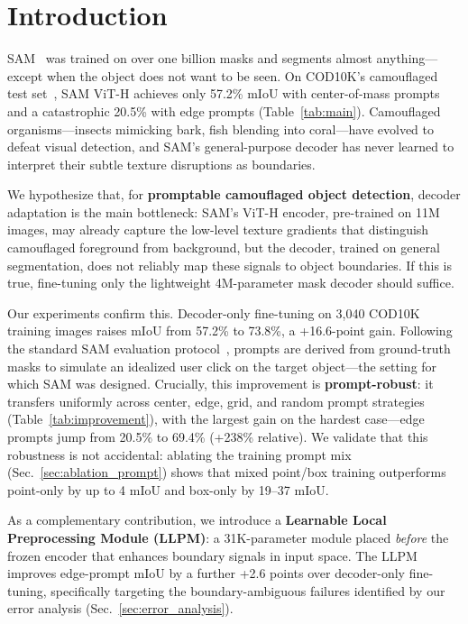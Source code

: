 \section{Introduction}

SAM~\cite{kirillov2023sam} was trained on over one billion masks and segments almost anything---except when the object does not want to be seen. On COD10K's camouflaged test set~\cite{fan2020cod10k}, SAM ViT-H achieves only 57.2\% mIoU with center-of-mass prompts and a catastrophic 20.5\% with edge prompts (Table~\ref{tab:main}). Camouflaged organisms---insects mimicking bark, fish blending into coral---have evolved to defeat visual detection, and SAM's general-purpose decoder has never learned to interpret their subtle texture disruptions as boundaries.

We hypothesize that, for \textbf{promptable camouflaged object detection}, decoder adaptation is the main bottleneck: SAM's ViT-H encoder, pre-trained on 11M images, may already capture the low-level texture gradients that distinguish camouflaged foreground from background, but the decoder, trained on general segmentation, does not reliably map these signals to object boundaries. If this is true, fine-tuning only the lightweight 4M-parameter mask decoder should suffice.

Our experiments confirm this. Decoder-only fine-tuning on 3,040 COD10K training images raises mIoU from 57.2\% to 73.8\%, a +16.6-point gain. Following the standard SAM evaluation protocol~\cite{kirillov2023sam}, prompts are derived from ground-truth masks to simulate an idealized user click on the target object---the setting for which SAM was designed. Crucially, this improvement is \textbf{prompt-robust}: it transfers uniformly across center, edge, grid, and random prompt strategies (Table~\ref{tab:improvement}), with the largest gain on the hardest case---edge prompts jump from 20.5\% to 69.4\% (+238\% relative). We validate that this robustness is not accidental: ablating the training prompt mix (Sec.~\ref{sec:ablation_prompt}) shows that mixed point/box training outperforms point-only by up to 4 mIoU and box-only by 19--37 mIoU.

As a complementary contribution, we introduce a \textbf{Learnable Local Preprocessing Module (LLPM)}: a 31K-parameter module placed \emph{before} the frozen encoder that enhances boundary signals in input space. The LLPM improves edge-prompt mIoU by a further +2.6 points over decoder-only fine-tuning, specifically targeting the boundary-ambiguous failures identified by our error analysis (Sec.~\ref{sec:error_analysis}).


